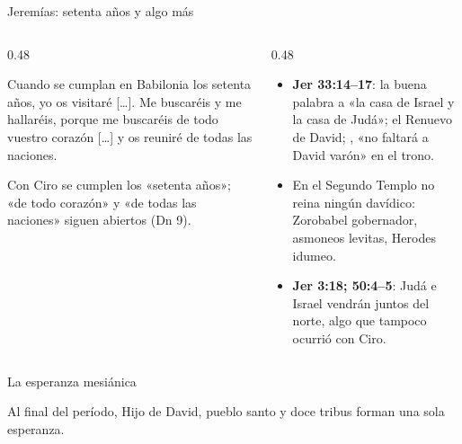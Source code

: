 \begin{frame}{Jeremías: setenta años y algo más}
\begin{columns}[T,onlytextwidth]
\begin{column}{0.48\textwidth}
\begin{cita}Cuando se cumplan en Babilonia los setenta años, yo os visitaré [\ldots]. Me buscaréis y me hallaréis, porque me buscaréis de todo vuestro corazón [\ldots] y os reuniré de todas las naciones.\end{cita}
\begin{clave}Con Ciro se cumplen los «setenta años»; «de todo corazón» y «de todas las naciones» siguen abiertos (Dn 9).\end{clave}
\end{column}
\begin{column}{0.48\textwidth}\footnotesize
\begin{itemize}
\item \textbf{Jer 33:14--17}: la buena palabra a «la casa de Israel y la casa de Judá»; el Renuevo de David; , «no faltará a David varón» en el trono.\medskip
\item En el Segundo Templo no reina ningún davídico: Zorobabel gobernador, asmoneos levitas, Herodes idumeo.\medskip
\item \textbf{Jer 3:18; 50:4--5}: Judá e Israel vendrán juntos del norte, algo que tampoco ocurrió con Ciro.
\end{itemize}
\end{column}
\end{columns}
\end{frame}

\begin{frame}{La esperanza mesiánica}
\centering
{}
\elabpropia
\vspace{8pt}
\begin{clave}\small Al final del período, Hijo de David, pueblo santo y doce tribus forman una sola esperanza.\end{clave}
\end{frame}

